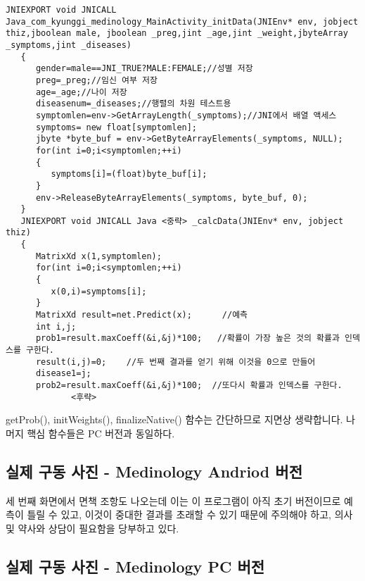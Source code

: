 \documentclass{report}
\begin{document}
\begin{verbatim}
JNIEXPORT void JNICALL Java_com_kyunggi_medinology_MainActivity_initData(JNIEnv* env, jobject thiz,jboolean male, jboolean _preg,jint _age,jint _weight,jbyteArray _symptoms,jint _diseases)
   {
      gender=male==JNI_TRUE?MALE:FEMALE;//성별 저장
      preg=_preg;//임신 여부 저장
      age=_age;//나이 저장
      diseasenum=_diseases;//행렬의 차원 테스트용
      symptomlen=env->GetArrayLength(_symptoms);//JNI에서 배열 액세스
      symptoms= new float[symptomlen];
      jbyte *byte_buf = env->GetByteArrayElements(_symptoms, NULL);
      for(int i=0;i<symptomlen;++i)
      {
         symptoms[i]=(float)byte_buf[i];
      }
      env->ReleaseByteArrayElements(_symptoms, byte_buf, 0);
   }
   JNIEXPORT void JNICALL Java <중략> _calcData(JNIEnv* env, jobject thiz)
   {
      MatrixXd x(1,symptomlen);
      for(int i=0;i<symptomlen;++i)
      {
         x(0,i)=symptoms[i];
      }
      MatrixXd result=net.Predict(x);      //예측
      int i,j;
      prob1=result.maxCoeff(&i,&j)*100;   //확률이 가장 높은 것의 확률과 인덱스를 구한다.
      result(i,j)=0;    //두 번째 결과를 얻기 위해 이것을 0으로 만들어
      disease1=j;
      prob2=result.maxCoeff(&i,&j)*100;  //또다시 확률과 인덱스를 구한다.
             <후략>     
\end{verbatim}
getProb(), initWeights(), finalizeNative() 함수는 간단하므로 지면상 생략합니다.
나머지 핵심 함수들은 PC 버전과 동일하다.

\subsection{실제 구동 사진 - Medinology Andriod 버전}


세 번째 화면에서 면책 조항도 나오는데 이는 이 프로그램이 아직 초기 버전이므로 예측이 틀릴 수 있고, 이것이 중대한 결과를 초래할 수 있기 때문에 주의해야 하고, 의사 및 약사와 상담이 필요함을 당부하고 있다.

\subsection{실제 구동 사진 - Medinology PC 버전}





\end{document}
